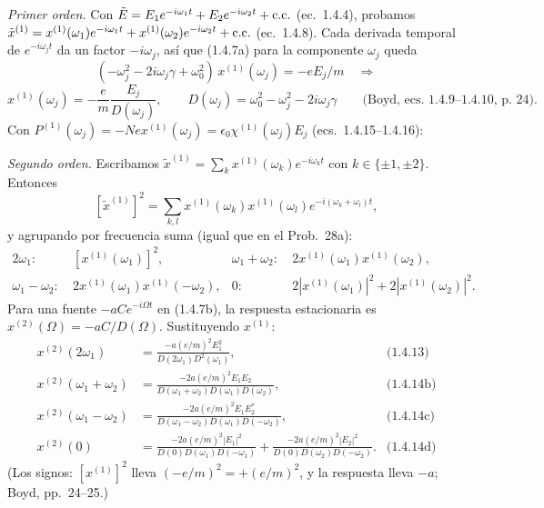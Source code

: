  \emph{Primer orden.} Con $\tilde E=E_1e^{-i\omega_1t}+E_2e^{-i\omega_2t}+\text{c.c.}$ (ec.~1.4.4), probamos $\tilde x^{(1)}=x^{(1)}(\omega_1)e^{-i\omega_1t}+x^{(1)}(\omega_2)e^{-i\omega_2t}+\text{c.c.}$ (ec.~1.4.8). Cada derivada temporal de $e^{-i\omega_jt}$ da un factor $-i\omega_j$, así que (1.4.7a) para la componente $\omega_j$ queda
\[(-\omega_j^2-2i\omega_j\gamma+\omega_0^2)\,x^{(1)}(\omega_j)=-eE_j/m\quad\Rightarrow\]
\[
x^{(1)}(\omega_j)=-\frac{e}{m}\frac{E_j}{D(\omega_j)},\qquad D(\omega_j)=\omega_0^2-\omega_j^2-2i\omega_j\gamma\qquad\text{(Boyd, ecs.~1.4.9--1.4.10, p.~24)}.
\]
Con $P^{(1)}(\omega_j)=-Nex^{(1)}(\omega_j)=\epsilon_0\chi^{(1)}(\omega_j)E_j$ (ecs.~1.4.15--1.4.16):

\emph{Segundo orden.} Escribamos $\tilde x^{(1)}=\sum_{k}x^{(1)}(\omega_k)e^{-i\omega_kt}$ con $k\in\{\pm1,\pm2\}$. Entonces
\[
[\tilde x^{(1)}]^2=\sum_{k,l}x^{(1)}(\omega_k)x^{(1)}(\omega_l)e^{-i(\omega_k+\omega_l)t},
\]
y agrupando por frecuencia suma (igual que en el Prob.~28a):
\begin{align*}
2\omega_1:&\ [x^{(1)}(\omega_1)]^2, & \omega_1+\omega_2:&\ 2x^{(1)}(\omega_1)x^{(1)}(\omega_2),\\
\omega_1-\omega_2:&\ 2x^{(1)}(\omega_1)x^{(1)}(-\omega_2), & 0:&\ 2|x^{(1)}(\omega_1)|^2+2|x^{(1)}(\omega_2)|^2.
\end{align*}
Para una fuente $-aCe^{-i\Omega t}$ en (1.4.7b), la respuesta estacionaria es $x^{(2)}(\Omega)=-aC/D(\Omega)$. Sustituyendo $x^{(1)}$:
\begin{align*}
x^{(2)}(2\omega_1)&=\frac{-a(e/m)^2E_1^2}{D(2\omega_1)D^2(\omega_1)}, &\text{(1.4.13)}\\
x^{(2)}(\omega_1+\omega_2)&=\frac{-2a(e/m)^2E_1E_2}{D(\omega_1+\omega_2)D(\omega_1)D(\omega_2)}, &\text{(1.4.14b)}\\
x^{(2)}(\omega_1-\omega_2)&=\frac{-2a(e/m)^2E_1E_2^*}{D(\omega_1-\omega_2)D(\omega_1)D(-\omega_2)}, &\text{(1.4.14c)}\\
x^{(2)}(0)&=\frac{-2a(e/m)^2|E_1|^2}{D(0)D(\omega_1)D(-\omega_1)}+\frac{-2a(e/m)^2|E_2|^2}{D(0)D(\omega_2)D(-\omega_2)}. &\text{(1.4.14d)}
\end{align*}
(Los signos: $[x^{(1)}]^2$ lleva $(-e/m)^2=+(e/m)^2$, y la respuesta lleva $-a$; Boyd, pp.~24--25.)

